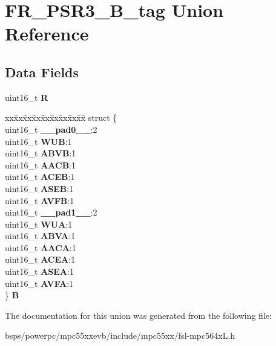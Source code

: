 \hypertarget{unionFR__PSR3__16B__tag}{}\section{F\+R\+\_\+\+P\+S\+R3\+\_\+B\+\_\+tag Union Reference}
\label{unionFR__PSR3__16B__tag}
\subsection*{Data Fields}
\begin{DoxyCompactItemize}
\item 
\mbox{\label{unionFR__PSR3__16B__tag_a8d1feacee5c1f76dcc7666ef29564a5d}} 
uint16\+\_\+t {\bfseries R}
\item 
\mbox{\label{unionFR__PSR3__16B__tag_a3e7643a56e783210a2d2b97fba149231}} 
\begin{tabbing}
xx\=xx\=xx\=xx\=xx\=xx\=xx\=xx\=xx\=\kill
struct \{\\
\>uint16\_t {\bfseries \_\_pad0\_\_}:2\\
\>uint16\_t {\bfseries WUB}:1\\
\>uint16\_t {\bfseries ABVB}:1\\
\>uint16\_t {\bfseries AACB}:1\\
\>uint16\_t {\bfseries ACEB}:1\\
\>uint16\_t {\bfseries ASEB}:1\\
\>uint16\_t {\bfseries AVFB}:1\\
\>uint16\_t {\bfseries \_\_pad1\_\_}:2\\
\>uint16\_t {\bfseries WUA}:1\\
\>uint16\_t {\bfseries ABVA}:1\\
\>uint16\_t {\bfseries AACA}:1\\
\>uint16\_t {\bfseries ACEA}:1\\
\>uint16\_t {\bfseries ASEA}:1\\
\>uint16\_t {\bfseries AVFA}:1\\
\} {\bfseries B}\\

\end{tabbing}\end{DoxyCompactItemize}


The documentation for this union was generated from the following file\+:\begin{DoxyCompactItemize}
\item 
bsps/powerpc/mpc55xxevb/include/mpc55xx/fsl-\/mpc564x\+L.\+h\end{DoxyCompactItemize}
